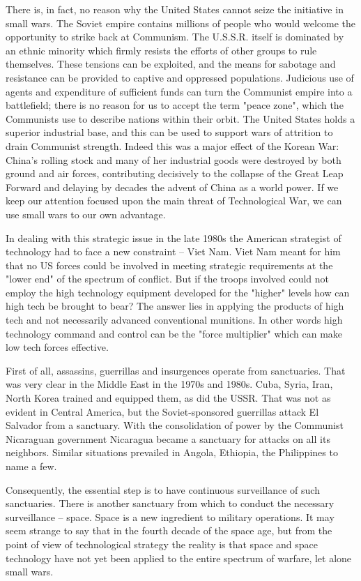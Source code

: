 There is, in fact, no reason why the United States cannot seize the initiative in small wars. The Soviet empire contains millions of people who would welcome the opportunity to strike back at Communism. The U.S.S.R. itself is dominated by an ethnic minority which firmly resists the efforts of other groups to rule themselves. These tensions can be exploited, and the means for sabotage and resistance can be provided to captive and oppressed populations. Judicious use of agents and expenditure of sufficient funds can turn the Communist empire into a battlefield; there is no reason for us to accept the term "peace zone", which the Communists use to describe nations within their orbit. The United States holds a superior industrial base, and this can be used to support wars of attrition to drain Communist strength. Indeed this was a major effect of the Korean War: China's rolling stock and many of her industrial goods were destroyed by both ground and air forces, contributing decisively to the collapse of the Great Leap Forward and delaying by decades the advent of China as a world power. If we keep our attention focused upon the main threat of Technological War, we can use small wars to our own advantage.

In dealing with this strategic issue in the late 1980s the American strategist of technology had to face a new constraint -- Viet Nam. Viet Nam meant for him that no US forces could be involved in meeting strategic requirements at the "lower end" of the spectrum of conflict. But if the troops involved could not employ the high technology equipment developed for the "higher" levels how can high tech be brought to bear? The answer lies in applying the products of high tech and not necessarily advanced conventional munitions. In other words high technology command and control can be the "force multiplier" which can make low tech forces effective.

First of all, assassins, guerrillas and insurgences operate from sanctuaries. That was very clear in the Middle East in the 1970s and 1980s. Cuba, Syria, Iran, North Korea trained and equipped them, as did the USSR. That was not as evident in Central America, but the Soviet-sponsored guerrillas attack El Salvador from a sanctuary. With the consolidation of power by the Communist Nicaraguan government Nicaragua became a sanctuary for attacks on all its neighbors. Similar situations prevailed in Angola, Ethiopia, the Philippines to name a few.

Consequently, the essential step is to have continuous surveillance of such sanctuaries. There is another sanctuary from which to conduct the necessary surveillance -- space. Space is a new ingredient to military operations. It may seem strange to say that in the fourth decade of the space age, but from the point of view of technological strategy the reality is that space and space technology have not yet been applied to the entire spectrum of warfare, let alone small wars.

